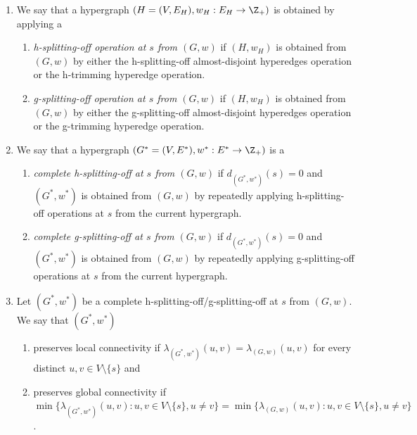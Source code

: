 \begin{definition}
\begin{enumerate}
        
       \item We say that a hypergraph $(H=(V, E_H), w_H: E_H\rightarrow \Z_+)$ is obtained by applying a 
        \begin{enumerate}
            \item \emph{h-splitting-off operation at $s$ from $(G, w)$} if $(H, w_H)$ is obtained from $(G, w)$ by either the h-splitting-off almost-disjoint hyperedges operation  or the h-trimming hyperedge operation. 
            \item \emph{g-splitting-off operation at $s$ from $(G, w)$} if $(H, w_H)$ is obtained from $(G, w)$ by either the g-splitting-off almost-disjoint hyperedges operation  or the g-trimming hyperedge operation. 
        \end{enumerate}
        
        \item We say that a hypergraph $(G^*=(V, E^*), w^*: E^*\rightarrow \Z_+)$ is a 
        \begin{enumerate}
            \item \emph{complete h-splitting-off at $s$ from $(G, w)$} if $d_{(G^*, w^*)}(s) = 0$ and $(G^*, w^*)$ is obtained from $(G, w)$ by repeatedly applying h-splitting-off operations at $s$ from the current hypergraph. 
            \item \emph{complete g-splitting-off at $s$ from $(G, w)$} if $d_{(G^*, w^*)}(s) = 0$ and $(G^*, w^*)$ is obtained from $(G, w)$ by repeatedly applying g-splitting-off operations at $s$ from the current hypergraph. 
        \end{enumerate}

        \item Let $(G^*, w^*)$ be a complete h-splitting-off/g-splitting-off at $s$ from $(G, w)$. We say that $(G^*, w^*)$ 
        \begin{enumerate}
            \item 
            preserves local connectivity if $\lambda_{(G^*, w^*)}(u, v)=\lambda_{(G, w)}(u, v)$ for every distinct $u, v\in V\setminus\{s\}$ and 
            
            \item preserves global connectivity if \\
            $\min\{\lambda_{(G^*, w^*)}(u, v): u, v\in V\setminus \{s\}, u \neq v\}=\min\{\lambda_{(G, w)}(u, v): u, v\in V\setminus \{s\}, u \neq v\}$. 
            
        \end{enumerate}
    \end{enumerate}
\end{definition}
\fi



